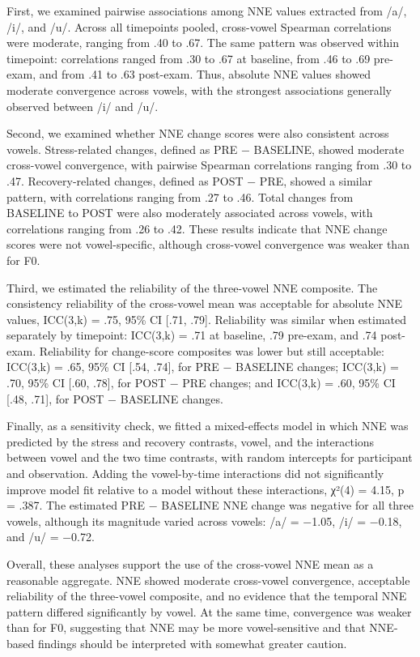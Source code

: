\documentclass[
  english,
  man,floatsintext]{apa6}
\begin{document}
First, we examined pairwise associations among NNE values extracted from /a/, /i/, and /u/. Across all timepoints pooled, cross-vowel Spearman correlations were moderate, ranging from .40 to .67. The same pattern was observed within timepoint: correlations ranged from .30 to .67 at baseline, from .46 to .69 pre-exam, and from .41 to .63 post-exam. Thus, absolute NNE values showed moderate convergence across vowels, with the strongest associations generally observed between /i/ and /u/.

Second, we examined whether NNE change scores were also consistent across vowels. Stress-related changes, defined as PRE − BASELINE, showed moderate cross-vowel convergence, with pairwise Spearman correlations ranging from .30 to .47. Recovery-related changes, defined as POST − PRE, showed a similar pattern, with correlations ranging from .27 to .46. Total changes from BASELINE to POST were also moderately associated across vowels, with correlations ranging from .26 to .42. These results indicate that NNE change scores were not vowel-specific, although cross-vowel convergence was weaker than for F0.

Third, we estimated the reliability of the three-vowel NNE composite. The consistency reliability of the cross-vowel mean was acceptable for absolute NNE values, ICC(3,k) = .75, 95\% CI {[}.71, .79{]}. Reliability was similar when estimated separately by timepoint: ICC(3,k) = .71 at baseline, .79 pre-exam, and .74 post-exam. Reliability for change-score composites was lower but still acceptable: ICC(3,k) = .65, 95\% CI {[}.54, .74{]}, for PRE − BASELINE changes; ICC(3,k) = .70, 95\% CI {[}.60, .78{]}, for POST − PRE changes; and ICC(3,k) = .60, 95\% CI {[}.48, .71{]}, for POST − BASELINE changes.

Finally, as a sensitivity check, we fitted a mixed-effects model in which NNE was predicted by the stress and recovery contrasts, vowel, and the interactions between vowel and the two time contrasts, with random intercepts for participant and observation. Adding the vowel-by-time interactions did not significantly improve model fit relative to a model without these interactions, χ²(4) = 4.15, p = .387. The estimated PRE − BASELINE NNE change was negative for all three vowels, although its magnitude varied across vowels: /a/ = −1.05, /i/ = −0.18, and /u/ = −0.72.

Overall, these analyses support the use of the cross-vowel NNE mean as a reasonable aggregate. NNE showed moderate cross-vowel convergence, acceptable reliability of the three-vowel composite, and no evidence that the temporal NNE pattern differed significantly by vowel. At the same time, convergence was weaker than for F0, suggesting that NNE may be more vowel-sensitive and that NNE-based findings should be interpreted with somewhat greater caution.
\end{document}
